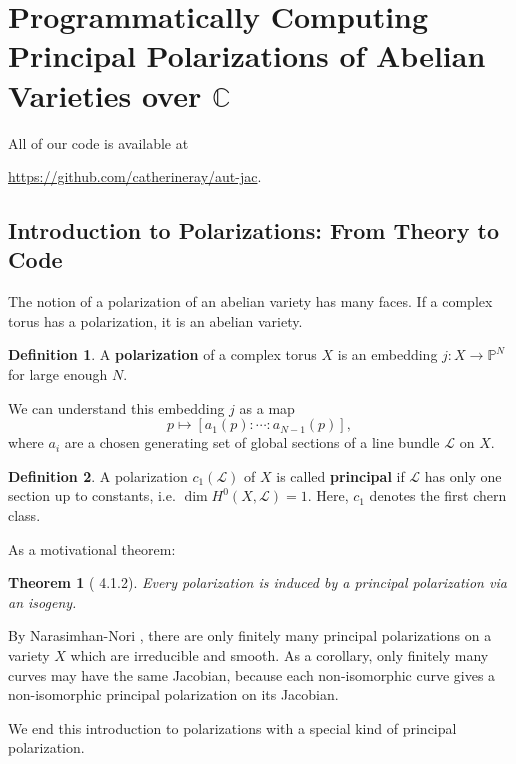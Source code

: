 \documentclass[12pt,reqno]{amsart}
\newcommand{\mc}{\mathcal}
\renewcommand{\P}{\mathbb{P}}
\newtheorem*{thm*}{Theorem}
\theoremstyle{definition}
\newtheorem{defn}{Definition}
\theoremstyle{remark}
\begin{document}
 \section{Programmatically Computing Principal Polarizations of Abelian Varieties over $\mathbb{C}$}

\label{sec:computing}

\noindent All of our code is available at \begin{center}\url{https://github.com/catherineray/aut-jac}.\end{center} 

\subsection{Introduction to Polarizations: From Theory to Code}
\label{sec:intropol}
The notion of a polarization of an abelian variety has many faces. If a complex torus has a polarization, it is an abelian variety.

\begin{defn} A \textbf{polarization} of a complex torus $X$ is an embedding $j: X \to \P^N$ for large enough $N$. \end{defn}


We can understand this embedding $j$ as a map $$p \mapsto [a_1(p) : \cdots : a_{N-1}(p)],$$ where $a_i$ are a chosen generating set of global sections of a line bundle $\mc{L}$ on $X$. 

\begin{defn}  A polarization $c_1(\mc{L})$ of $X$ is called \textbf{principal} if $\mc{L}$ has only one section up to constants, i.e. $\dim H^0(X, \mc{L}) = 1$. Here, $c_1$ denotes the first chern class. \end{defn} 

As a motivational theorem:

\begin{thm*} [\cite{bl} 4.1.2] Every polarization is induced by a principal polarization via an isogeny. \end{thm*}

By Narasimhan-Nori \cite{nn}, there are only finitely many principal polarizations on a variety $X$ which are irreducible and smooth. As a corollary, only finitely many curves may have the same Jacobian, because each non-isomorphic curve gives a non-isomorphic principal polarization on its Jacobian.

\vspace{+5pt}
\noindent We end this introduction to polarizations with a special kind of principal polarization. 
\end{document}
